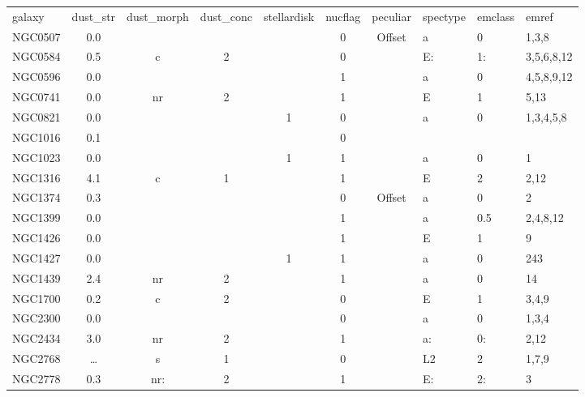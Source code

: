 \begin{tabular}{lcccccclll}
galaxy & dust_str & dust_morph & dust_conc & stellardisk & nucflag & peculiar & spectype & emclass & emref \\
NGC0507     & 0.0 &     &    &               & 0 & Offset   & a & 0  & 1,3,8             \\
NGC0584     & 0.5 & c   & 2  &               & 0 &          & E:     & 1: & 3,5,6,8,12    \\
NGC0596     & 0.0 &     &    &               & 1           &          & a & 0  & 4,5,8,9,12       \\
NGC0741     & 0.0 & nr  & 2  &               & 1           &          & E & 1  & 5,13              \\
NGC0821     & 0.0 &     &    &  1      & 0 &          & a & 0  & 1,3,4,5,8     \\
NGC1016     & 0.1 &     &    &               & 0 &          & &    &               \\
NGC1023     & 0.0 &     &    &  1      & 1           &          & a & 0  & 1             \\
NGC1316     & 4.1 & c   & 1  &               & 1           &          & E & 2  & 2,12              \\
NGC1374     & 0.3 &     &    &               & 0 & Offset   & a & 0  & 2             \\
NGC1399     & 0.0 &     &    &               & 1           &          & a & 0.5& 2,4,8,12      \\
NGC1426     & 0.0 &     &    &               & 1           &          & E & 1  & 9             \\
NGC1427     & 0.0 &     &    &  1      & 1           &          & a & 0  & 243             \\
NGC1439     & 2.4 & nr  & 2  &               & 1           &          & a & 0  & 14            \\
NGC1700     & 0.2 & c   & 2  &               & 0 &          & E & 1  & 3,4,9         \\
NGC2300     & 0.0 &     &    &               & 0 &          & a & 0  & 1,3,4         \\
NGC2434     & 3.0 & nr  & 2  &               & 1           &          & a:     & 0: & 2,12              \\
NGC2768     & \dots & s & 1  &               & 0 &          & L2     & 2  & 1,7,9             \\
NGC2778     & 0.3 & nr: & 2  &               & 1           &          & E:     & 2: & 3             \\

\end{tabular}
